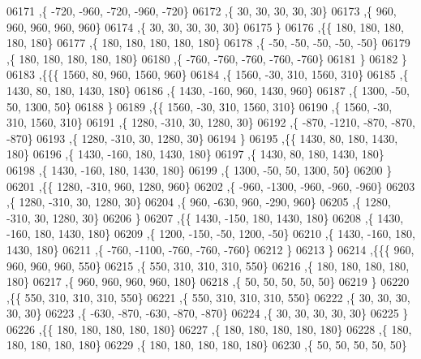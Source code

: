 \begin{DoxyCode}
06171     ,\{  -720,  -960,  -720,  -960,  -720\}
06172     ,\{    30,    30,    30,    30,    30\}
06173     ,\{   960,   960,   960,   960,   960\}
06174     ,\{    30,    30,    30,    30,    30\}
06175     \}
06176    ,\{\{   180,   180,   180,   180,   180\}
06177     ,\{   180,   180,   180,   180,   180\}
06178     ,\{   -50,   -50,   -50,   -50,   -50\}
06179     ,\{   180,   180,   180,   180,   180\}
06180     ,\{  -760,  -760,  -760,  -760,  -760\}
06181     \}
06182    \}
06183   ,\{\{\{  1560,    80,   960,  1560,   960\}
06184     ,\{  1560,   -30,   310,  1560,   310\}
06185     ,\{  1430,    80,   180,  1430,   180\}
06186     ,\{  1430,  -160,   960,  1430,   960\}
06187     ,\{  1300,   -50,    50,  1300,    50\}
06188     \}
06189    ,\{\{  1560,   -30,   310,  1560,   310\}
06190     ,\{  1560,   -30,   310,  1560,   310\}
06191     ,\{  1280,  -310,    30,  1280,    30\}
06192     ,\{  -870, -1210,  -870,  -870,  -870\}
06193     ,\{  1280,  -310,    30,  1280,    30\}
06194     \}
06195    ,\{\{  1430,    80,   180,  1430,   180\}
06196     ,\{  1430,  -160,   180,  1430,   180\}
06197     ,\{  1430,    80,   180,  1430,   180\}
06198     ,\{  1430,  -160,   180,  1430,   180\}
06199     ,\{  1300,   -50,    50,  1300,    50\}
06200     \}
06201    ,\{\{  1280,  -310,   960,  1280,   960\}
06202     ,\{  -960, -1300,  -960,  -960,  -960\}
06203     ,\{  1280,  -310,    30,  1280,    30\}
06204     ,\{   960,  -630,   960,  -290,   960\}
06205     ,\{  1280,  -310,    30,  1280,    30\}
06206     \}
06207    ,\{\{  1430,  -150,   180,  1430,   180\}
06208     ,\{  1430,  -160,   180,  1430,   180\}
06209     ,\{  1200,  -150,   -50,  1200,   -50\}
06210     ,\{  1430,  -160,   180,  1430,   180\}
06211     ,\{  -760, -1100,  -760,  -760,  -760\}
06212     \}
06213    \}
06214   ,\{\{\{   960,   960,   960,   960,   550\}
06215     ,\{   550,   310,   310,   310,   550\}
06216     ,\{   180,   180,   180,   180,   180\}
06217     ,\{   960,   960,   960,   960,   180\}
06218     ,\{    50,    50,    50,    50,    50\}
06219     \}
06220    ,\{\{   550,   310,   310,   310,   550\}
06221     ,\{   550,   310,   310,   310,   550\}
06222     ,\{    30,    30,    30,    30,    30\}
06223     ,\{  -630,  -870,  -630,  -870,  -870\}
06224     ,\{    30,    30,    30,    30,    30\}
06225     \}
06226    ,\{\{   180,   180,   180,   180,   180\}
06227     ,\{   180,   180,   180,   180,   180\}
06228     ,\{   180,   180,   180,   180,   180\}
06229     ,\{   180,   180,   180,   180,   180\}
06230     ,\{    50,    50,    50,    50,    50\}

\end{DoxyCode}
